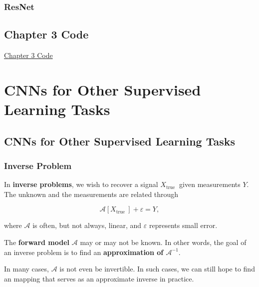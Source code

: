 \documentclass{report}
\begin{document}
\section{ResNet}

\chapter*{Chapter 3 Code}

\href{https://drive.google.com/file/d/12O9fLasWDA-kOKBD-lE-1UhCl-PoDf0z/view?usp=sharing}{Chapter 3 Code}

\part{CNNs for Other Supervised Learning Tasks}

\chapter{CNNs for Other Supervised Learning Tasks}

\section{Inverse Problem}

\begin{definition}
    In \textbf{inverse problems}, we wish to recover a signal $X_{\text {true }}$ given measurements $Y$. The unknown and the measurements are related through

    $$
    \mathcal{A}\left[X_{\text {true }}\right]+\varepsilon=Y,
    $$

    where $\mathcal{A}$ is often, but not always, linear, and $\varepsilon$ represents small error.

    The \textbf{forward model} $\mathcal{A}$ may or may not be known. In other words, the goal of an inverse problem is to find an \textbf{approximation of $\mathcal{A}^{-1}$}.

    In many cases, $\mathcal{A}$ is not even be invertible. In such cases, we can still hope to find an mapping that serves as an approximate inverse in practice.
\end{definition}
\end{document}
